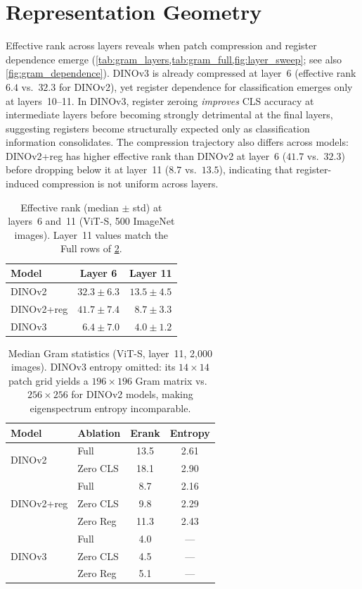 \documentclass[10pt,twocolumn,letterpaper]{article}
\begin{document}
\section{Representation Geometry}
\label{sec:supp_gram}

Effective rank across layers reveals when patch compression and register dependence emerge (\cref{tab:gram_layers,tab:gram_full,fig:layer_sweep}; see also \cref{fig:gram_dependence}).
DINOv3 is already compressed at layer~6 (effective rank $6.4$ vs.\ $32.3$ for DINOv2), yet register dependence for classification emerges only at layers~10--11.
In DINOv3, register zeroing \emph{improves} CLS accuracy at intermediate layers before becoming strongly detrimental at the final layers, suggesting registers become structurally expected only as classification information consolidates.
The compression trajectory also differs across models: DINOv2+reg has higher effective rank than DINOv2 at layer~6 ($41.7$ vs.\ $32.3$) before dropping below it at layer~11 ($8.7$ vs.\ $13.5$), indicating that register-induced compression is not uniform across layers.

\begin{table}[b]
\centering
\caption{Effective rank (median $\pm$ std) at layers~6 and~11
(ViT-S, 500 ImageNet images).
Layer~11 values match the Full rows of \cref{tab:gram_full}.}
\label{tab:gram_layers}
\small
\begin{tabular}{@{}lcc@{}}
\toprule
Model & Layer 6 & Layer 11 \\
\midrule
DINOv2     & $32.3 \pm 6.3$  & $13.5 \pm 4.5$ \\
DINOv2+reg & $41.7 \pm 7.4$  & $\phantom{0}8.7 \pm 3.3$ \\
DINOv3     & $\phantom{0}6.4 \pm 7.0$  & $\phantom{0}4.0 \pm 1.2$ \\
\bottomrule
\end{tabular}
\end{table}

\begin{table}[t]
\centering
\caption{Median Gram statistics (ViT-S, layer~11, 2{,}000 images).
DINOv3 entropy omitted: its $14{\times}14$ patch grid yields a
$196{\times}196$ Gram matrix vs.\ $256{\times}256$ for DINOv2 models,
making eigenspectrum entropy incomparable.}
\label{tab:gram_full}
\small
\begin{tabular}{@{}llcc@{}}
\toprule
Model & Ablation & Erank & Entropy \\
\midrule
\multirow{2}{*}{DINOv2}
  & Full     & 13.5 & 2.61 \\
  & Zero CLS & 18.1 & 2.90 \\
\midrule
\multirow{3}{*}{DINOv2+reg}
  & Full     & \phantom{0}8.7 & 2.16 \\
  & Zero CLS & \phantom{0}9.8 & 2.29 \\
  & Zero Reg & 11.3 & 2.43 \\
\midrule
\multirow{3}{*}{DINOv3}
  & Full     & \phantom{0}4.0 & --- \\
  & Zero CLS & \phantom{0}4.5 & --- \\
  & Zero Reg & \phantom{0}5.1 & --- \\
\bottomrule
\end{tabular}
\end{table}
\end{document}
